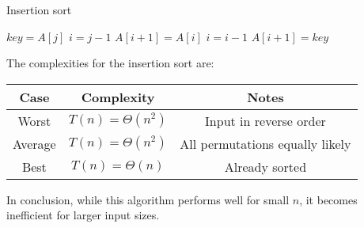 \begin{algorithm}[H]
    \caption{Insertion sort}
        \begin{algorithmic}[1]
                \State $key = A[j]$
                \State $i = j-1$
                    \State $A[i+1] = A[i]$
                    \State $i = i - 1$
                \EndWhile
                \State $A[i+1] = key$
            \EndFor
        \end{algorithmic}
\end{algorithm}
The complexities for the insertion sort are: 
\renewcommand*{\arraystretch}{2}
\begin{table}[H]
    \centering
    \begin{tabular}{|c|c|c|}
    \hline
    \textbf{Case} & \textbf{Complexity}                                            & \textbf{Notes}                  \\ \hline
    Worst         & $T(n)=\Theta(n^2)$                       & Input in reverse order          \\
    Average       & $T(n)=\Theta(n^2)$ & All permutations equally likely \\
    Best          & $T(n)=\Theta(n)$              & Already sorted                  \\ \hline
    \end{tabular}
\end{table}
\renewcommand*{\arraystretch}{1}
In conclusion, while this algorithm performs well for small $n$, it becomes inefficient for larger input sizes.


